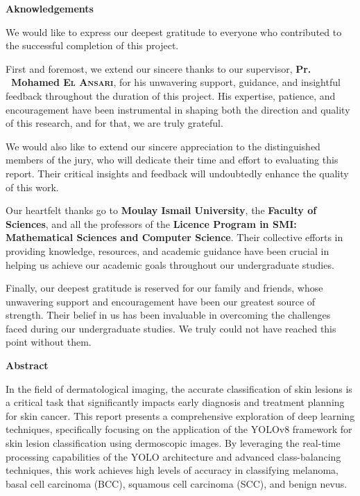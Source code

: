 \documentclass[a4paper,12pt]{report}
\begin{document}
\newpage
\begin{spacing}{1.5}
     \begin{center}
         \textbf{\huge Aknowledgements}
     \end{center}

    We would like to express our deepest gratitude to everyone who contributed to the successful completion of this project.

    First and foremost, we extend our sincere thanks to our supervisor, \textbf{Pr. ~Mohamed \textsc{El Ansari}}, for his unwavering support, guidance, and insightful feedback throughout the duration of this project. His expertise, patience, and encouragement have been instrumental in shaping both the direction and quality of this research, and for that, we are truly grateful.

    We would also like to extend our sincere appreciation to the distinguished members of the jury, who will dedicate their time and effort to evaluating this report. Their critical insights and feedback will undoubtedly enhance the quality of this work.

    Our  heartfelt thanks go to \textbf{Moulay Ismail University}, the \textbf{Faculty of Sciences}, and all the professors of the \textbf{Licence Program in SMI: Mathematical Sciences and Computer Science}. Their collective efforts in providing knowledge, resources, and academic guidance have been crucial in helping us achieve our academic goals throughout our undergraduate studies.

    Finally, our deepest gratitude is reserved for our family and friends, whose unwavering support and encouragement have been our greatest source of strength. Their belief in us has been invaluable in overcoming the challenges faced during our undergraduate studies. We truly could not have reached this point without them.

\newpage
\begin{center}
    \textbf{\huge Abstract}
\end{center}

    In the field of dermatological imaging, the accurate classification of skin lesions is a critical task that significantly impacts early diagnosis and treatment planning for skin cancer. This report presents a comprehensive exploration of deep learning techniques, specifically focusing on the application of the YOLOv8 framework for skin lesion classification using dermoscopic images. By leveraging the real-time processing capabilities of the YOLO architecture and advanced class-balancing techniques, this work achieves high levels of accuracy in classifying melanoma, basal cell carcinoma (BCC), squamous cell carcinoma (SCC), and benign nevus.


\end{spacing}
\end{document}
